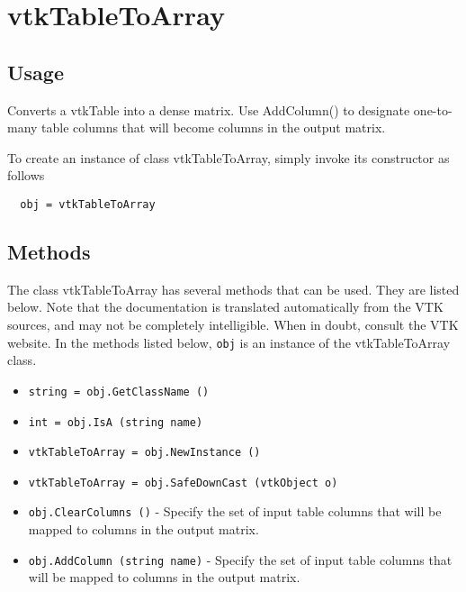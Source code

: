 \section{vtkTableToArray}

\subsection{Usage}

 Converts a vtkTable into a dense matrix.  Use AddColumn() to
 designate one-to-many table columns that will become columns in the
 output matrix.


To create an instance of class vtkTableToArray, simply
invoke its constructor as follows
\begin{verbatim}
  obj = vtkTableToArray
\end{verbatim}
\subsection{Methods}

The class vtkTableToArray has several methods that can be used.
  They are listed below.
Note that the documentation is translated automatically from the VTK sources,
and may not be completely intelligible.  When in doubt, consult the VTK website.
In the methods listed below, \verb|obj| is an instance of the vtkTableToArray class.
\begin{itemize}
\item  \verb|string = obj.GetClassName ()|

\item  \verb|int = obj.IsA (string name)|

\item  \verb|vtkTableToArray = obj.NewInstance ()|

\item  \verb|vtkTableToArray = obj.SafeDownCast (vtkObject o)|

\item  \verb|obj.ClearColumns ()| -  Specify the set of input table columns that will be mapped to columns
 in the output matrix.

\item  \verb|obj.AddColumn (string name)| -  Specify the set of input table columns that will be mapped to columns
 in the output matrix.

\end{itemize}
